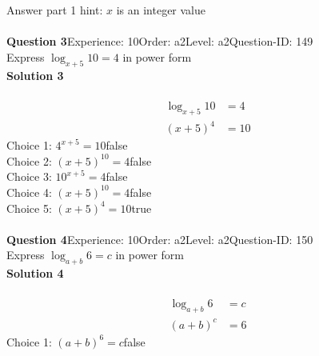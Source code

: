 \documentclass{article}
\begin{document}
Answer part 1 hint: \hspace{15pt}$x$ is an integer value\\
\\[4pt]
\noindent\textbf{Question 3}\hspace{20pt}Experience: 10\hspace{20pt}Order: a2\hspace{20pt}Level: a2\hspace{20pt}Question-ID: 149\\[2pt]
Express $\log_{x+5}10=4$ in power form\\[4pt]
\noindent\textbf{Solution 3}\\[2pt]
\\[-35pt]\begin{align*}
\log_{x+5}10&=4\\[2pt]
(x+5)^4&=10
\end{align*}
Choice 1: \hspace{20pt}$4^{x+5}=10$\hspace{20pt}false\\
Choice 2: \hspace{20pt}$(x+5)^{10}=4$\hspace{20pt}false\\
Choice 3: \hspace{20pt}$10^{x+5}=4$\hspace{20pt}false\\
Choice 4: \hspace{20pt}$(x+5)^{10}=4$\hspace{20pt}false\\
Choice 5: \hspace{20pt}$(x+5)^4=10$\hspace{20pt}true\\
\\[4pt]
\noindent\textbf{Question 4}\hspace{20pt}Experience: 10\hspace{20pt}Order: a2\hspace{20pt}Level: a2\hspace{20pt}Question-ID: 150\\[2pt]
Express $\log_{a+b}6=c$ in power form\\[4pt]
\noindent\textbf{Solution 4}\\[2pt]
\\[-35pt]\begin{align*}
\log_{a+b}6&=c\\[2pt]
(a+b)^c&=6
\end{align*}
Choice 1: \hspace{20pt}$(a+b)^6=c$\hspace{20pt}false\\
\end{document}
